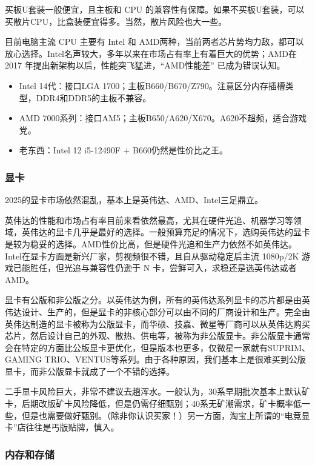 \documentclass[../main.tex]{subfiles}
\begin{document}
买板U套装一般便宜，且主板和 CPU 的兼容性有保障。如果不买板U套装，可以买散片CPU，比盒装便宜得多。当然，散片风险也大一些。

目前电脑主流 CPU 主要有 Intel 和 AMD两种，当前两者芯片势均力敌，都可以放心选择。Intel名声较大，多年以来在市场占有率上有着巨大的优势；AMD在2017 年提出新架构以后，性能突飞猛进，“AMD性能差” 已成为错误认知。

\begin{itemize}
  \item Intel 14代：接口LGA 1700；主板B660/B670/Z790。注意区分内存插槽类型，DDR4和DDR5的主板不兼容。
  \item AMD 7000系列：接口AM5；主板B650/A620/X670。A620不超频，适合游戏党。
  \item 老东西：Intel 12 i5-12490F + B660仍然是性价比之王。
\end{itemize}

\subsubsection{显卡}

2025的显卡市场依然混乱，基本上是英伟达、AMD、Intel三足鼎立。

英伟达的性能和市场占有率目前来看依然最高，尤其在硬件光追、机器学习等领域，英伟达的显卡几乎是最好的选择。一般预算充足的情况下，选购英伟达的显卡是较为稳妥的选择。AMD性价比高，但是硬件光追和生产力依然不如英伟达。Intel在显卡方面是新兴厂家，剪视频很不错，且自从驱动稳定后主流 1080p/2K 游戏已能胜任，但光追与兼容性仍逊于 N 卡，尝鲜可入，求稳还是选英伟达或者AMD。

显卡有公版和非公版之分。以英伟达为例，所有的英伟达系列显卡的芯片都是由英伟达设计、生产的，但是显卡的非核心部分可以由不同的厂商设计和生产。完全由英伟达制造的显卡被称为公版显卡，而华硕、技嘉、微星等厂商可以从英伟达购买芯片，然后设计自己的外观、散热、供电等，被称为非公版显卡。非公版显卡通常会在特定的方面比公版显卡更优化，但是版本也更多，仅微星一家就有SUPRIM、GAMING TRIO、VENTUS等系列。由于各种原因，我们基本上是很难买到公版显卡，而非公版显卡就成了一个不错的选择。

二手显卡风险巨大，非常不建议去趟浑水。一般认为，30系早期批次基本上默认矿卡，后期改版矿卡风险降低，但是仍需仔细甄别；40系无矿潮需求，矿卡概率低一些，但是也需要做好甄别。（除非你认识买家！）另一方面，淘宝上所谓的“电竞显卡”店往往是丐版贴牌，慎入。

\subsubsection{内存和存储}
\end{document}
